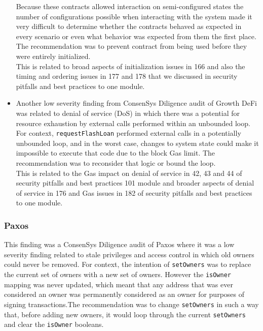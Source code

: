 \begin{itemize}
  Because these contracts allowed interaction on semi-configured states
  the number of configurations possible when interacting with the system
  made it very difficult to determine whether the contracts behaved as
  expected in every scenario or even what behavior was expected from
  them the first place. The recommendation was to prevent contract from
  being used before they were entirely initialized.\\

  This is related to broad aspects of initialization issues in 166 and
  also the timing and ordering issues in 177 and 178 that we discussed
  in security pitfalls and best practices to one module.
\item
  Another low severity finding from ConsenSys Diligence audit of Growth
  DeFi was related to denial of service (DoS) in which there was a
  potential for resource exhaustion by external calls performed within
  an unbounded loop.\\

  For context, \texttt{requestFlashLoan} performed external calls in a
  potentially unbounded loop, and in the worst case, changes to system
  state could make it impossible to execute that code due to the block
  Gas limit. The recommendation was to reconsider that logic or bound
  the loop.\\

  This is related to the Gas impact on denial of service in 42, 43 and
  44 of security pitfalls and best practices 101 module and broader
  aspects of denial of service in 176 and Gas issues in 182 of security
  pitfalls and best practices to one module.
\end{itemize}

\subsubsection{Paxos}\label{paxos}

This finding was a ConsenSys Diligence audit of Paxos where it was a low
severity finding related to stale privileges and access control in which
old owners could never be removed. For context, the intention of
\texttt{setOwners} was to replace the current set of owners with a new
set of owners. However the \texttt{isOwner} mapping was never updated,
which meant that any address that was ever considered an owner was
permanently considered as an owner for purposes of signing
transactions.The recommendation was to change \texttt{setOwners} in such
a way that, before adding new owners, it would loop through the current
\texttt{setOwners} and clear the \texttt{isOwner} booleans.

